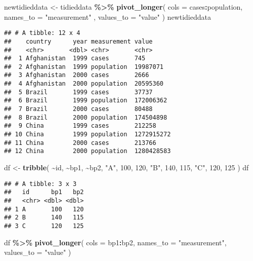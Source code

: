 \documentclass[
]{article}
\newenvironment{Shaded}{\begin{snugshade}}{\end{snugshade}}
\newcommand{\AttributeTok}[1]{\textcolor[rgb]{0.13,0.29,0.53}{#1}}
\newcommand{\DecValTok}[1]{\textcolor[rgb]{0.00,0.00,0.81}{#1}}
\newcommand{\FunctionTok}[1]{\textcolor[rgb]{0.13,0.29,0.53}{\textbf{#1}}}
\newcommand{\NormalTok}[1]{#1}
\newcommand{\OtherTok}[1]{\textcolor[rgb]{0.56,0.35,0.01}{#1}}
\newcommand{\SpecialCharTok}[1]{\textcolor[rgb]{0.81,0.36,0.00}{\textbf{#1}}}
\newcommand{\StringTok}[1]{\textcolor[rgb]{0.31,0.60,0.02}{#1}}
\begin{document}
\begin{Shaded}
\begin{Highlighting}[]
\NormalTok{newtidieddata }\OtherTok{\textless{}{-}}\NormalTok{ tidieddata }\SpecialCharTok{\%\textgreater{}\%}
 \FunctionTok{pivot\_longer}\NormalTok{(}
 \AttributeTok{cols =}\NormalTok{ cases}\SpecialCharTok{:}\NormalTok{population,}
 \AttributeTok{names\_to =} \StringTok{"measurement"}
\NormalTok{,}
 \AttributeTok{values\_to =} \StringTok{"value"}
\NormalTok{ )}
\NormalTok{newtidieddata}
\end{Highlighting}
\end{Shaded}

\begin{verbatim}
## # A tibble: 12 x 4
##    country      year measurement value     
##    <chr>       <dbl> <chr>       <chr>     
##  1 Afghanistan  1999 cases       745       
##  2 Afghanistan  1999 population  19987071  
##  3 Afghanistan  2000 cases       2666      
##  4 Afghanistan  2000 population  20595360  
##  5 Brazil       1999 cases       37737     
##  6 Brazil       1999 population  172006362 
##  7 Brazil       2000 cases       80488     
##  8 Brazil       2000 population  174504898 
##  9 China        1999 cases       212258    
## 10 China        1999 population  1272915272
## 11 China        2000 cases       213766    
## 12 China        2000 population  1280428583
\end{verbatim}

\begin{Shaded}
\begin{Highlighting}[]
\NormalTok{df }\OtherTok{\textless{}{-}} \FunctionTok{tribble}\NormalTok{(}
 \SpecialCharTok{\textasciitilde{}}\NormalTok{id, }\SpecialCharTok{\textasciitilde{}}\NormalTok{bp1, }\SpecialCharTok{\textasciitilde{}}\NormalTok{bp2,}
 \StringTok{"A"}\NormalTok{, }\DecValTok{100}\NormalTok{, }\DecValTok{120}\NormalTok{,}
 \StringTok{"B"}\NormalTok{, }\DecValTok{140}\NormalTok{, }\DecValTok{115}\NormalTok{,}
 \StringTok{"C"}\NormalTok{, }\DecValTok{120}\NormalTok{, }\DecValTok{125}
\NormalTok{)}
\NormalTok{df}
\end{Highlighting}
\end{Shaded}

\begin{verbatim}
## # A tibble: 3 x 3
##   id      bp1   bp2
##   <chr> <dbl> <dbl>
## 1 A       100   120
## 2 B       140   115
## 3 C       120   125
\end{verbatim}

\begin{Shaded}
\begin{Highlighting}[]
\NormalTok{df }\SpecialCharTok{\%\textgreater{}\%}
 \FunctionTok{pivot\_longer}\NormalTok{(}
 \AttributeTok{cols =}\NormalTok{ bp1}\SpecialCharTok{:}\NormalTok{bp2,}
 \AttributeTok{names\_to =} \StringTok{"measurement"}\NormalTok{,}
 \AttributeTok{values\_to =} \StringTok{"value"}
\NormalTok{ )}
\end{Highlighting}
\end{Shaded}
\end{document}
